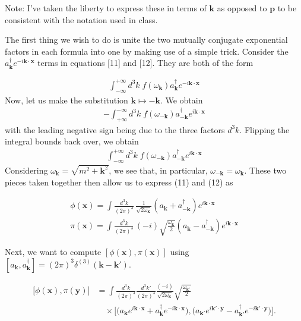 \documentclass[12pt]{article}
\newcommand{\w}{\omega}
\begin{document}
Note: I've taken the liberty to express these in terms of $\mathbf{k}$ as opposed
to $\mathbf{p}$ to be consistent with the notation used in class. 

The first thing we wish to do is unite the two mutually conjugate exponential
factors in each formula into one by making use of a simple trick. Consider
the $a_{\mathbf{k}}^{\dagger}e^{-i\mathbf{k \cdot x}}$ terms in equations [11] 
and [12]. They are both of the form

\begin{align*}
    \int_{-\infty}^{+\infty} d^3k \; f(\w_{\mathbf{k}}) a_{\mathbf{k}}^{\dagger}e^{-i\mathbf{k \cdot x}}
\end{align*}
Now, let us make the substitution $\mathbf{k} \mapsto -\mathbf{k}$. We obtain
\begin{align*}
    - \int_{+\infty}^{-\infty} d^3k \; f(\w_{-\mathbf{k}}) a_{\mathbf{-k}}^{\dagger}e^{i\mathbf{k
    \cdot x}}
\end{align*}
with the leading negative sign being due to the three factors $d^3k$. Flipping
the integral bounds back over, we obtain
\begin{align*}
    \int_{-\infty}^{+\infty} d^3k \; f(\w_{-\mathbf{k}}) a_{\mathbf{-k}}^{\dagger}e^{i\mathbf{k \cdot x}}
\end{align*}
Considering $\w_{\mathbf{k}} = \sqrt{m^2 + \mathbf{k}^2}$, we see that, in
particular, $\w_{-\mathbf{k}} = \w_{\mathbf{k}}$. These two pieces taken 
together then allow us to express (11) and (12) as

\begin{align}
    \boxed{\phi(\mathbf{x}) = \int \frac{d^3k}{(2\pi)^3} \,
        \frac{1}{\sqrt{2\omega_{\mathbf{k}}}}
        \left( a_{\mathbf{k}} + a_{-\mathbf{k}}^{\dagger} \right)
        e^{i\mathbf{k}\cdot \mathbf{x}}} \\
    \boxed{\pi(\mathbf{x}) = \int \frac{d^3k}{(2\pi)^3} \,
        (-i)\sqrt{\frac{\omega_{\mathbf{k}}}{2}}
        \left( a_{\mathbf{k}} - a_{-\mathbf{k}}^{\dagger} \right)
        e^{i\mathbf{k}\cdot \mathbf{x}} }
\end{align}

\noindent Next, we want to compute $\left[ \phi(\mathbf{x}), \pi{(\mathbf{x})} \right]$
using $\left[a_{\mathbf{k}}, a_{\mathbf{k}}^{\dagger} \right] =
(2\pi)^3\delta^{(3)}(\mathbf{k} - \mathbf{k}')$.

\[
\begin{aligned}
\big[\phi(\mathbf{x}),\pi(\mathbf{y})\big]
&= \int\frac{d^3k}{(2\pi)^3}\frac{d^3k'}{(2\pi)^3}
\frac{(-i)}{\sqrt{2\omega_{\mathbf{k}}}}\sqrt{\frac{\omega_{\mathbf{k}'}}{2}} \\
&\quad \times
\Big[ \big( a_{\mathbf{k}} e^{i\mathbf{k}\cdot\mathbf{x}} + a_{\mathbf{k}}^\dagger e^{-i\mathbf{k}\cdot\mathbf{x}}\big),
\big( a_{\mathbf{k}'} e^{i\mathbf{k}'\cdot\mathbf{y}} - a_{\mathbf{k}'}^\dagger e^{-i\mathbf{k}'\cdot\mathbf{y}}\big) \Big].
\end{aligned}
\]
\end{document}

